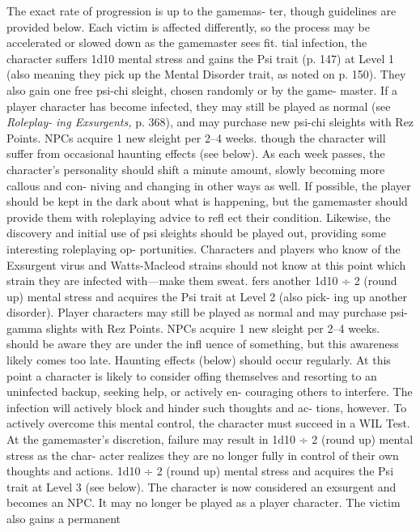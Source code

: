 The exact rate of progression is up to the gamemas-
ter, though guidelines are provided below. Each victim 
is affected differently, so the process may be accelerated 
or slowed down as the gamemaster sees fit.
tial infection, the character suffers 1d10 mental 
stress and gains the Psi trait (p. 147) at Level 1 
(also meaning they pick up the Mental Disorder 
trait, as noted on p. 150). They also gain one free 
psi-chi sleight, chosen randomly or by the game-
master. If a player character has become infected, 
they may still be played as normal (see \textit{Roleplay-}
\textit{ing Exsurgents,} p. 368), and may purchase new 
psi-chi sleights with Rez Points. NPCs acquire 1 
new sleight per 2–4 weeks.
though the character will suffer from occasional 
haunting effects (see below). As each week passes, 
the character's personality should shift a minute 
amount, slowly becoming more callous and con-
niving and changing in other ways as well. If 
possible, the player should be kept in the dark 
about what is happening, but the gamemaster 
should provide them with roleplaying advice to 
refl ect their condition. Likewise, the discovery 
and initial use of psi sleights should be played 
out, providing some interesting roleplaying op-
portunities. Characters and players who know of 
the Exsurgent virus and Watts-Macleod strains 
should not know at this point which strain they 
are infected with—make them sweat.
fers another 1d10 ÷ 2 (round up) mental stress 
and acquires the Psi trait at Level 2 (also pick-
ing up another disorder). Player characters may 
still be played as normal and may purchase psi-
gamma slights with Rez Points. NPCs acquire 1 
new sleight per 2–4 weeks.
should be aware they are under the infl uence 
of something, but this awareness likely comes 
too late. Haunting effects (below) should occur 
regularly. At this point a character is likely to 
consider offing themselves and resorting to an 
uninfected backup, seeking help, or actively en-
couraging others to interfere. The infection will 
actively block and hinder such thoughts and ac-
tions, however. To actively overcome this mental 
control, the character must succeed in a WIL Test. 
At the gamemaster's discretion, failure may result 
in 1d10 ÷ 2 (round up) mental stress as the char-
acter realizes they are no longer fully in control 
of their own thoughts and actions. 
1d10 ÷ 2 (round up) mental stress and acquires 
the Psi trait at Level 3 (see below). The character 
is now considered an exsurgent and becomes 
an NPC. It may no longer be played as a player 
character. The victim also gains a permanent 
